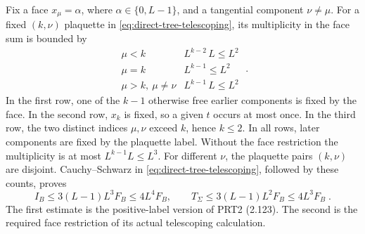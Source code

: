 \documentclass[11pt]{article}
\begin{document}
Fix a face $x_\mu=\alpha$, where $\alpha\in \{0,L-1\}$, and a tangential component $\nu\ne \mu$. For a fixed $(k,\nu)$ plaquette in \eqref{eq:direct-tree-telescoping}, its multiplicity in the face sum is bounded by
\begin{equation}\label{eq:direct-face-multiplicities}
    \begin{array}{c|c}
        \mu<k & L^{k-2}\,L\leq L^2\\
        \mu=k & L^{k-1}\leq L^2\\
        \mu>k,\ \mu\ne \nu & L^{k-1}\,L\leq L^2
    \end{array}\;.
\end{equation}
In the first row, one of the $k-1$ otherwise free earlier components is fixed by the face. In the second row, $x_k$ is fixed, so a given $t$ occurs at most once. In the third row, the two distinct indices $\mu,\nu$ exceed $k$, hence $k\leq 2$. In all rows, later components are fixed by the plaquette label. Without the face restriction the multiplicity is at most $L^{k-1}L\leq L^3$. For different $\nu$, the plaquette pairs $(k,\nu)$ are disjoint. Cauchy--Schwarz in \eqref{eq:direct-tree-telescoping}, followed by these counts, proves
\begin{equation}\label{eq:direct-block-face-bound}
    I_B\leq 3(L-1)L^3F_B\leq 4L^4F_B,
    \qquad
    T_\Sigma\leq 3(L-1)L^2F_B\leq 4L^3F_B\;.
\end{equation}
The first estimate is the positive-label version of PRT2 (2.123). The second is the required face restriction of its actual telescoping calculation.
\end{document}
